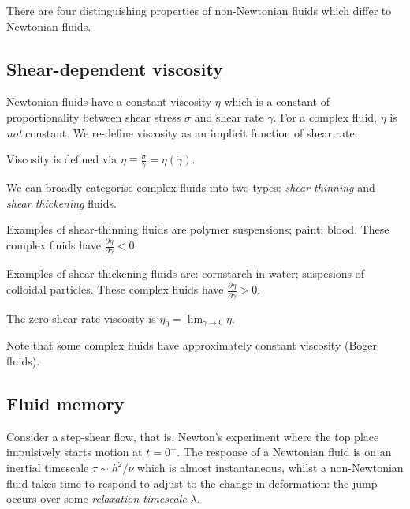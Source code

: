 \documentclass{jknotes}
\begin{document}
There are four distinguishing properties of non-Newtonian fluids which differ
to Newtonian fluids.

\subsection{Shear-dependent viscosity}
Newtonian fluids have a constant viscosity $\eta$ which is a constant of
proportionality between shear stress $\sigma$ and shear rate $\dot{\gamma}$.
For a complex fluid, $\eta$ is \emph{not} constant. We re-define viscosity as
an implicit function of shear rate.
\begin{defn}
	Viscosity is defined via $\eta \equiv \frac{\sigma}{\dot{\gamma}} =
	\eta(\dot{\gamma})$.
\end{defn}

We can broadly categorise complex fluids into two types: \emph{shear thinning}
and \emph{shear thickening} fluids.

\begin{center}
\end{center}

Examples of shear-thinning fluids are polymer suspensions; paint; blood. These
complex fluids have $\frac{\partial \eta}{\partial \dot{\gamma}} < 0$.

Examples of shear-thickening fluids are: cornstarch in water; suspesions of
colloidal particles. These complex fluids have $\frac{\partial \eta}{\partial
\dot{\gamma}} > 0$.

\begin{defn}
	The zero-shear rate viscosity is $\eta_0 = \lim_{\dot{\gamma} \to 0}
	\eta$.
\end{defn}

Note that some complex fluids have approximately constant viscosity (Boger
fluids).

\subsection{Fluid memory}
Consider a step-shear flow, that is, Newton's experiment where the top place
impulsively starts motion at $t=0^+$. The response of a Newtonian fluid is on
an inertial timescale $\tau \sim h^2/\nu$ which is almost instantaneous,
whilst a non-Newtonian fluid takes time to respond to adjust to the change in
deformation: the jump occurs over some \emph{relaxation timescale} $\lambda$.
\end{document}
